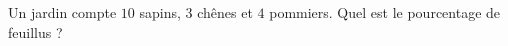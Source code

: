 
\begin{exercice}\label{exoPremiere-0008}

    Un jardin compte \( 10\) sapins, \(  3\) chênes et \( 4\) pommiers. Quel est le pourcentage de feuillus ?

\end{exercice}
